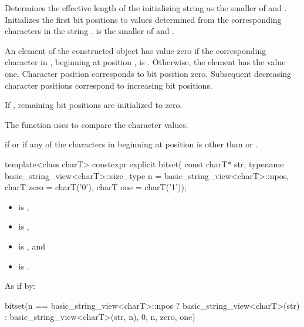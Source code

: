\begin{itemdescr}
\pnum
\effects
Determines the effective length
 of the initializing string as the smaller of
 and
.
Initializes the first  bit
positions to values determined from the corresponding characters in the string
.
 is the smaller of  and .

\pnum
An element of the constructed object has value zero if the
corresponding character in , beginning at position
, is
.
Otherwise, the element has the value one.
Character position  corresponds to bit position zero.
Subsequent decreasing character positions correspond to increasing bit positions.

\pnum
If , remaining bit positions are initialized to zero.

\pnum
The function uses 
to compare the character values.

\pnum
\throws
{}%
 if  or
%
 if any of
the  characters in 
beginning at position 
is other than  or .
\end{itemdescr}

%
\begin{itemdecl}
template<class charT>
  constexpr explicit bitset(
    const charT* str,
    typename basic_string_view<charT>::size_type n = basic_string_view<charT>::npos,
    charT zero = charT('0'),
    charT one = charT('1'));
\end{itemdecl}

\begin{itemdescr}
\pnum
\constraints
\begin{itemize}
\item {} is ,
\item {} is ,
\item {} is , and
\item {} is .
\end{itemize}

\pnum
\effects
As if by:
\begin{codeblock}
bitset(n == basic_string_view<charT>::npos
          ? basic_string_view<charT>(str)
          : basic_string_view<charT>(str, n),
       0, n, zero, one)
\end{codeblock}
\end{itemdescr}


